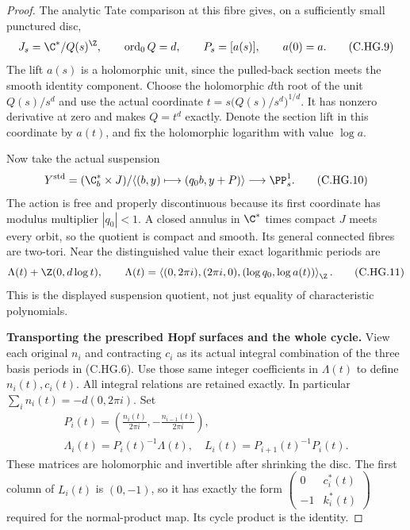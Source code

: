 \begin{proof}
The analytic Tate comparison at this fibre
gives, on a sufficiently small punctured disc,
\[
       J_s=\C^*/Q(s)^{\Z},\qquad
       \operatorname{ord}_0Q=d,\qquad P_s=[a(s)],
       \qquad a(0)=a.
\tag{C.HG.9}
\]
The lift $a(s)$ is a holomorphic unit, since
the pulled-back section meets the smooth
identity component. Choose the holomorphic
$d$th root of the unit $Q(s)/s^d$ and use the
actual coordinate
$t=s\bigl(Q(s)/s^d\bigr)^{1/d}$.
It has nonzero derivative at zero and makes
$Q=t^d$ exactly. Denote the section lift in
this coordinate by $a(t)$, and fix the
holomorphic logarithm with value $\log a$.

Now take the actual suspension
\[
 Y^{\rm std}=
  (\C^*_b\times J)/
      \langle(b,y)\longmapsto(q_0 b,y+P)\rangle
          \longrightarrow\PP^1_s .
\tag{C.HG.10}
\]
The action is free and properly discontinuous
because its first coordinate has modulus
multiplier $|q_0|<1$. A closed annulus in
$\C^*$ times compact $J$ meets every orbit,
so the quotient is compact and smooth.
Its general connected fibres are two-tori.
Near the distinguished value their exact
logarithmic periods are
\[
 \Lambda(t)+\Z(0,d\log t),\qquad
 \Lambda(t)=
 \left\langle(0,2\pi i),(2\pi i,0),
                  (\log q_0,\log a(t))\right\rangle_{\Z}.
\tag{C.HG.11}
\]
This is the displayed suspension quotient,
not just equality of characteristic polynomials.

\par\medskip\noindent\textbf{Transporting the prescribed Hopf surfaces and the whole cycle.}
View each original $n_i$ and contracting
$c_i$ as its actual integral combination
of the three basis periods in (C.HG.6).
Use those same integer coefficients in
$\Lambda(t)$ to define $n_i(t),c_i(t)$.
All integral relations are retained exactly.
In particular $\sum_i n_i(t)=-d(0,2\pi i)$.
Set
\[
 \begin{gathered}
 P_i(t)=\left(\frac{n_i(t)}{2\pi i},
                    -\frac{n_{i-1}(t)}{2\pi i}\right),\\
 \Lambda_i(t)=P_i(t)^{-1}\Lambda(t),
 \quad L_i(t)=P_{i+1}(t)^{-1}P_i(t).
 \end{gathered}
\tag{C.HG.12}
\]
These matrices are holomorphic and invertible
after shrinking the disc. The first column
of $L_i(t)$ is $(0,-1)$, so it has exactly the
form
$\left(\begin{smallmatrix}0&c_i^*(t)\\-1&k_i^*(t)\end{smallmatrix}\right)$
required for the normal-product map.
Its cycle product is the identity.


\end{proof}

